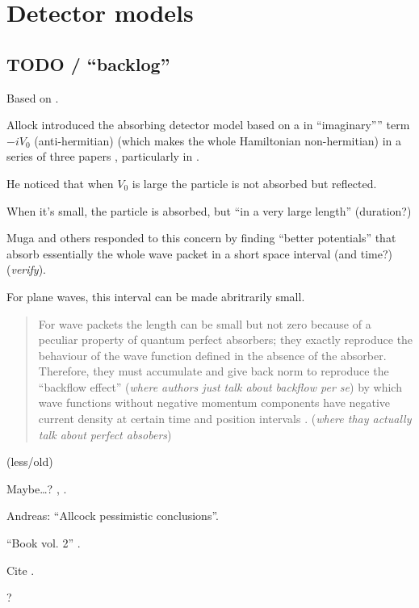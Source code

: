 \section{Detector models}

\subsection*{TODO / ``backlog''}

Based on \cite[sec. 1.4.3]{TQM1}.

Allock introduced the absorbing detector model based on a in ``imaginary'''' term $-iV_0$
(anti-hermitian) (which makes the whole Hamiltonian non-hermitian) in a series of three papers
\parencite{Allcock-1, Allcock-2, Allcock-3},
particularly in \cite[sec. II-IV]{Allcock-2}.

He noticed that when $V_0$ is large the particle is not absorbed but reflected.

When it's small, the particle is absorbed, but ``in a very large length'' (duration?)

Muga and others responded to this concern by finding ``better potentials'' that absorb essentially the
whole wave packet in a short space interval (and time?)
\parencite{Muga_TOAQM, Muga_CompositeAbsPot, ComplexAbsPot} (\emph{verify}).

For plane waves, this interval can be made abritrarily small.

\begin{quotation}
  For wave packets the length can be small but not zero because of a
  peculiar property of quantum perfect absorbers; they exactly reproduce
  the behaviour of the wave function defined in the absence of the absorber.
  Therefore, they must accumulate and give back norm to reproduce the
  ``backflow effect'' \parencite{Bracken_bf, Bracken_ProbTransport}
  (\emph{where authors just talk about backflow per se})
  by which wave functions without negative momentum components
  have negative current density at certain time and position intervals
  \parencite{Leavens_backflow}. (\emph{where thay actually talk about perfect absobers})
\end{quotation}

\cite{ComplexAbsPot}

\cite{Werner_ArrivalTime} (less/old)

Maybe\dots? \cite{ProbCurrent}, \cite{Ruschhaupt_QMoT}.

Andreas: ``Allcock pessimistic conclusions''.

``Book vol. 2'' \cite{TQM2:Detector}.

Cite \cite{Muga_ArrTimeOpNormal, Damborenea, Sudarshan_Zeno, Echanobe, Savvidou-1, Savvidou-2}.

\cite{Damborenea_atomic}?